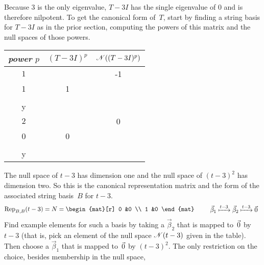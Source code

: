 \begin{example}
Because $3$ is the only eigenvalue, 
$T-3I$ has the single eigenvalue of \( 0 \) and is therefore nilpotent.
To get the canonical form of~$T$, start by
finding a string basis for $T-3I$
as in the prior section, computing the powers of this matrix 
and the null spaces of those powers.
\begin{center}
  \begin{tabular}{c|cc}
    \multicolumn{1}{c}{\textit{power} \( p \)}  &\( (T-3I)^p \)  &\( \mathscr{N}((T-3I)^p)  \)   \\  
    \hline
    \( 1 \)
    &\(  
       \matrixvenlarge{\begin{mat}[r]
         -1  &-1 \\
         1   &1   \\
       \end{mat}}  \)
    &\( \set{\matrixvenlarge{\colvec{-y \\ y}}\suchthat
                               y\in\C}  \)   \\
    \( 2 \)
    &\(  
       \matrixvenlarge{\begin{mat}[r]
         0  &0  \\
         0  &0   \\
       \end{mat}}  \)
    &\( \set{\matrixvenlarge{\colvec{x \\ y}}\suchthat
                               x,y\in\C}  \)   \\
  \end{tabular}
\end{center}
The null space of $t-3$ has dimension one
and the null space of $(t-3)^2$ has dimension two.
So this is the canonical representation matrix and the form of the
associated string basis~$B$ for $t-3$.
\begin{equation*}
  \rep{t-3}{B,B}
  =N=
  \begin{mat}[r]
      0  &0   \\
      1  &0
  \end{mat}
  \qquad
  \begin{array}{r}
    \vec{\beta}_1\xmapsto{t-3}\vec{\beta}_2\xmapsto{t-3}\zero  \\
  \end{array}  
\end{equation*}
Find example elements for such a basis
by taking a $\vec{\beta}_2$ that is mapped to~$\vec{0}$
by $t-3$ (that is, pick an element of 
the null space $\mathscr{N}(t-3)$ given in the table).
Then choose a $\vec{\beta}_1$ that is mapped to~$\vec{0}$ by $(t-3)^2$.
The only restriction on the choice, besides membership in the null space,

\end{example}
